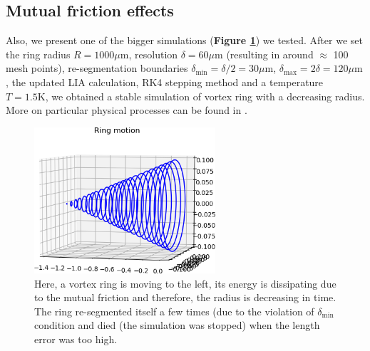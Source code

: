 \subsection*{Mutual friction effects}

Also, we present one of the bigger simulations (\textbf{Figure \ref{circle}}) we tested. After we set the ring radius $R=1000\mu\text{m}$, resolution $\delta=60\mu\text{m}$ (resulting in around $\approx$ 100 mesh points),
re-segmentation boundaries $\delta_{\text{min}}= \delta /2 = 30\mu\text{m}$, $\delta_{\text{max}} = 2\delta = 120\mu\text{m}$, the updated LIA calculation, RK4 stepping method and a temperature $T=1.5\text{K}$, we obtained a stable simulation of vortex ring with a decreasing radius. More on particular physical processes can be found in \cite{donnelly_book}.

\begin{figure}[h]
	\centering
	\includegraphics[width=0.6\textwidth]{graphics/results/ring-motion_full}
	\caption{Here, a vortex ring is moving to the left, its energy is dissipating due to the mutual friction and therefore, the radius is decreasing in time. The ring re-segmented itself a few times (due to the violation of $\delta_{\text{min}}$ condition and died (the simulation was stopped) when the length error was too high.}
	\label{circle}
\end{figure}
\newpage
